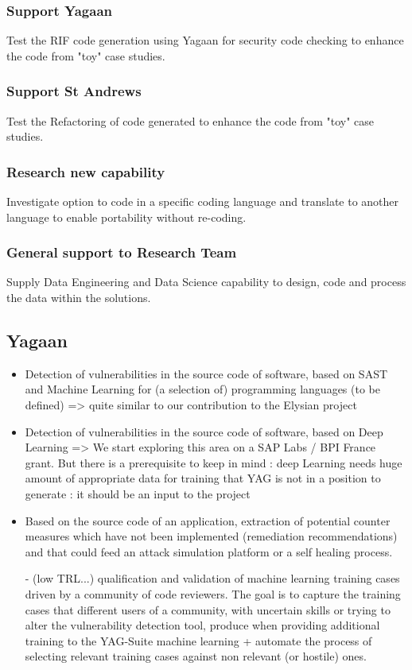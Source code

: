 \documentclass[a4paper,11pt]{article}
\begin{document}
\subsubsection{Support Yagaan}
Test the RIF code generation using Yagaan for security code checking to enhance the code from "toy" case studies.

\subsubsection{Support St Andrews}
Test the Refactoring of code generated to enhance the code from "toy" case studies.

\subsubsection{Research new capability}
Investigate option to code in a specific coding language and translate to another language to enable portability without re-coding.

\subsubsection{General support to Research Team}
Supply Data Engineering and Data Science capability to design, code and process the data within the solutions.


\subsection{Yagaan}
\begin{itemize}

\item Detection of vulnerabilities in the source code of software, based on SAST and Machine Learning for (a selection of) programming languages (to be defined) => quite similar to our contribution to the Elysian project

\item Detection of vulnerabilities in the source code of software, based on Deep Learning => We start exploring this area on a SAP Labs / BPI France grant. But there is a prerequisite to keep in mind : deep Learning needs huge amount of appropriate data for training that YAG is not in a position to generate : it should be an input to the project

\item Based on the source code of an application, extraction of potential counter measures which have not been implemented (remediation recommendations) and that could feed an attack simulation platform or a self healing process.

- (low TRL...) qualification and validation of machine learning training cases driven by a community of code reviewers. The goal is to capture the training cases that different users of a community, with uncertain skills or trying to alter the vulnerability detection tool, produce when providing additional training to the YAG-Suite machine learning + automate the process of selecting relevant training cases against non relevant (or hostile) ones.

\end{itemize}
\end{document}
